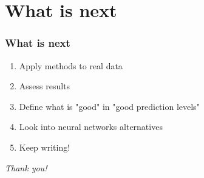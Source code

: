 \documentclass{beamer}
\begin{document}
\section{What is next}
\begin{frame}
	\frametitle{What is next}
	\begin{enumerate}
		\item Apply methods to real data
		\item Assess results
		\item Define what is  "good" in "good prediction levels"
		\item Look into neural networks alternatives
		\item Keep writing!
	\end{enumerate}
\end{frame}

\begin{frame}{}
	\centering \Huge
	\emph{Thank you!}
\end{frame}
\end{document}
